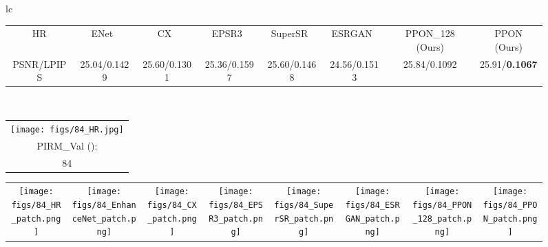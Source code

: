 \documentclass[preprint]{elsarticle}
\begin{document}
\begin{figure*}[htpb]
{\begin{tabular}{lc}
\begin{adjustbox}{valign=t}
\begin{tabular}{cccccccc}
					HR & \hspace{-3mm} ENet~\cite{EnhanceNet} & \hspace{-3mm} CX~\cite{CX} & \hspace{-3mm} EPSR3~\cite{EPSR} & 
					SuperSR~\cite{ESRGAN} & \hspace{-3mm} ESRGAN~\cite{ESRGAN} & \hspace{-3mm} PPON\_128 (Ours) & \hspace{-3mm} PPON (Ours) \\
					
					PSNR/LPIPS & \hspace{-3mm} 25.04/0.1429 & \hspace{-3mm} 25.60/0.1301 & \hspace{-3mm} 25.36/0.1597 &
					25.60/0.1468 & \hspace{-3mm} 24.56/0.1513 & \hspace{-3mm} 25.84/0.1092 & \hspace{-3mm} 25.91/\textbf{0.1067} \\
				\end{tabular}
			\end{adjustbox}
			\\
			\begin{adjustbox}{valign=t}
				\scriptsize
				\begin{tabular}{c}
					\texttt{[image: figs/84\_HR.jpg]} \\
					PIRM\_Val (): \\
					84 \\
				\end{tabular}
			\end{adjustbox}
			\hspace{-3mm}
			\begin{adjustbox}{valign=t}
				\scriptsize
				\begin{tabular}{cccccccc}
					\texttt{[image: figs/84\_HR\_patch.png]} &
					\hspace{-3mm}
					\texttt{[image: figs/84\_EnhanceNet\_patch.png]} &
					\hspace{-3mm}
					\texttt{[image: figs/84\_CX\_patch.png]} &
					\hspace{-3mm}
					\texttt{[image: figs/84\_EPSR3\_patch.png]} &
					\hspace{-3mm}					
					\texttt{[image: figs/84\_SuperSR\_patch.png]} &
					\hspace{-3mm}
					\texttt{[image: figs/84\_ESRGAN\_patch.png]} &
					\hspace{-3mm}
					\texttt{[image: figs/84\_PPON\_128\_patch.png]} &
					\hspace{-3mm}
					\texttt{[image: figs/84\_PPON\_patch.png]} \\
					

\end{tabular}
\end{adjustbox}
\end{tabular}}
\end{figure*}
\end{document}
